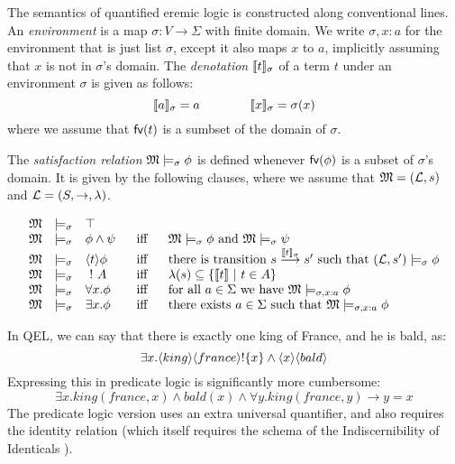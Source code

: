 \begin{definition}
The semantics of quantified eremic logic is constructed along
conventional lines. An \emph{environment} is a map $\sigma : V
\rightarrow \Sigma$ with finite domain.  We write $\sigma, x : a$ for
the environment that is just list $\sigma$, except it also maps $x$ to
$a$, implicitly assuming that $x$ is not in $\sigma$'s domain.  The
\emph{denotation} $\lbrack\!\lbrack t \rbrack\!\rbrack_{\sigma}$ of a term $t$ under an
environment $\sigma$ is given as follows:
\[
   \lbrack\!\lbrack a \rbrack\!\rbrack_{\sigma} = a
      \qquad\qquad
   \lbrack\!\lbrack x \rbrack\!\rbrack_{\sigma} = \sigma(x)
\]
where we assume that $\mathsf{fv}(t)$ is a sumbset of the domain of $\sigma$.

The \emph{satisfaction
  relation} $\frak{M} \models_{\sigma} \phi$ is defined whenever
$\mathsf{fv}(\phi)$ is a subset of $\sigma$'s domain. It is given by the
following clauses, where we assume that $\frak{M} = (\mathcal{L}, s)$ and $\mathcal{L} =
(S, \rightarrow, \lambda)$.

\[
\begin{array}{lclcl}
  \MMM & \models_{\sigma} & \top   \\
  \MMM & \models_{\sigma} & \phi \AND \psi &\ \mbox{ iff } \ & \MMM  \models_{\sigma} \phi \mbox { and } \MMM \models_{\sigma} \psi  \\
  \MMM & \models_{\sigma} & \langle t \rangle \phi & \mbox{ iff } & \text{there is transition } s \TRANS{\SEMB{t}_{\sigma}} s' \mbox { such that } (\LLL, s') \models_{\sigma} \phi  \\
  \MMM & \models_{\sigma} & \fBang A &\mbox{ iff } & \lambda(s) \subseteq \{\SEMB{t}\ |\ t \in A\} \\
  \MMM & \models_{\sigma} & \forall x.\phi &\mbox{ iff } & \text{for all} \ a \in \Sigma\ \text{we have}\ \MMM \models_{\sigma, x : a} \phi \\
  \MMM & \models_{\sigma} & \exists x.\phi &\mbox{ iff } & \text{there exists} \ a \in \Sigma \ \text{such that}\  \MMM \models_{\sigma, x : a} \phi
\end{array}
\]


\end{definition}

In QEL, we can say that there is exactly one king of France, and he is bald, as:
\[
\exists x . \langle king \rangle \langle france \rangle ! \{x\} \land \langle x \rangle \langle bald \rangle \]
Expressing this in predicate logic is significantly more cumbersome:
\[
\exists x. king(france, x) \land bald(x) \land \forall y. king(france, y) \rightarrow y = x
\]
The predicate logic version uses an extra universal quantifier, and also requires the identity relation (which itself requires the schema of the Indiscernibility of Identicals ).

